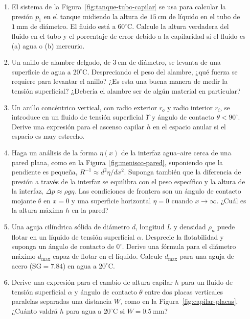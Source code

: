 \begin{enumerate}
\item El sistema de la Figura~\ref{fig:tanque-tubo-capilar} se usa para calcular la presión $p_1$ en el tanque midiendo la altura de $15\ \mathrm{cm}$ de líquido en el tubo de $1\ \mathrm{mm}$ de diámetro. El fluido está a $60^\circ\mathrm{C}$. Calcule la altura verdadera del fluido en el tubo y el porcentaje de error debido a la capilaridad si el fluido es (a) agua o (b) mercurio.

\figuraTanqueTuboCapilar

\item Un anillo de alambre delgado, de $3\ \mathrm{cm}$ de diámetro, se levanta de una superficie de agua a $20^\circ\mathrm{C}$. Despreciando el peso del alambre, ¿qué fuerza se requiere para levantar el anillo? ¿Es esta una buena manera de medir la tensión superficial? ¿Debería el alambre ser de algún material en particular?

\item Un anillo concéntrico vertical, con radio exterior $r_o$ y radio interior $r_i$, se introduce en un fluido de tensión superficial $\Upsilon$ y ángulo de contacto $\theta < 90^\circ$. Derive una expresión para el ascenso capilar $h$ en el espacio anular si el espacio es muy estrecho.

\item Haga un análisis de la forma $\eta(x)$ de la interfaz agua--aire cerca de una pared plana, como en la Figura~\ref{fig:menisco-pared}, suponiendo que la pendiente es pequeña, $R^{-1} \approx d^2\eta/dx^2$. Suponga también que la diferencia de presión a través de la interfaz se equilibra con el peso específico y la altura de la interfaz, $\Delta p \approx \rho g \eta$. Las condiciones de frontera son un ángulo de contacto mojante $\theta$ en $x = 0$ y una superficie horizontal $\eta = 0$ cuando $x \to \infty$. ¿Cuál es la altura máxima $h$ en la pared?

\figuraMeniscoPared

\item Una aguja cilíndrica sólida de diámetro $d$, longitud $L$ y densidad $\rho_n$ puede flotar en un líquido de tensión superficial $\alpha$. Desprecie la flotabilidad y suponga un ángulo de contacto de $0^\circ$. Derive una fórmula para el diámetro máximo $d_{\mathrm{max}}$ capaz de flotar en el líquido. Calcule $d_{\mathrm{max}}$ para una aguja de acero ($\mathrm{SG} = 7.84$) en agua a $20^\circ\mathrm{C}$.

\item Derive una expresión para el cambio de altura capilar $h$ para un fluido de tensión superficial $\alpha$ y ángulo de contacto $\theta$ entre dos placas verticales paralelas separadas una distancia $W$, como en la Figura~\ref{fig:capilar-placas}. ¿Cuánto valdrá $h$ para agua a $20^\circ\mathrm{C}$ si $W = 0.5\ \mathrm{mm}$?


\end{enumerate}
